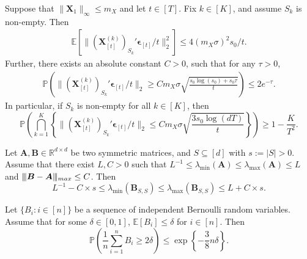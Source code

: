 \documentclass[10pt,a4paper]{amsart}
\newcommand{\Exp}{\mathbb{E}}
\newcommand{\Pro}{\mathbb{P}}
\newcommand{\bA}{\boldsymbol{A}}
\newcommand{\bX}{\boldsymbol{X}}
\newcommand{\bd}[1]{\boldsymbol{#1}}
\newcommand{\bepsilon}{\bd{\epsilon}}
\newcommand{\lmax}[1]{\lambda_{\max}\left(#1\right)}
\newcommand{\lmin}[1]{\lambda_{\min}\left(#1\right)}
\newcommand{\mR}{\mathbb{R}}
\newcommand{\mn}{\vert\kern-0.25ex \vert\kern-0.25ex \vert}
\begin{document}
\begin{lemma} \label{lemma: ell_2 bound of x epsilon}
Suppose that $\|\bX_1\|_{\infty}\le m_X$ and let $t \in [T]$. Fix $k \in [K]$, and assume $S_k$ is non-empty. Then 
\begin{align*}
     \Exp\left[ \|(\bX_{[t]}^{(k)})_{S_k}'\bepsilon_{[t]}/t \|_2^2 \right] \le  4(m_X\sigma)^2s_0/t.
\end{align*}
Further, there exists an absolute constant $C>0$, such that for any $\tau>0$,
\begin{align*}
\Pro\left(\|(\bX_{[t]}^{(k)})_{S_k}'\bepsilon_{[t]}/t\|_2 \ge C  m_X\sigma\sqrt{\frac{s_0\log (s_0) + s_0\tau}{t}} \right) \le 2e^{-\tau}.
\end{align*}
In particular, if $S_k$ is non-empty for all $k \in [K]$, then
$$\Pro\left(\bigcap_{k = 1}^{K}\left\{\|(\bX_{[t]}^{(k)})_{S_k}'\bepsilon_{[t]}/t\|_2 \le C  m_X\sigma\sqrt{\frac{3s_0\log (dT)}{t}} \right\} \right)\geq 1- \frac{K}{T^2}.$$
\end{lemma}

\begin{lemma} \label{lemma: subgaussian lower eigenvalue whp}
Let $\bA, \bd{B}\in \mR^{d\times d}$ be two symmetric matrices, and  $S \subseteq [d]$ with $s:=|S| > 0$.  Assume that there exist  $L,C>0$ such that 
$L^{-1}\le \lmin{\bA}\le\lmax{\bA}\le L$ and $\mn\bd{B}-\bA\mn_{\textup{max}}\le C$.
Then 
$$
L^{-1}-C\times s\le \lmin{\bd{B}_{S,S}} \le \lmax{\bd{B}_{S,S}}\le L+C \times s.
$$
\end{lemma}

\begin{lemma}\label{lemma: concentration inequality of bernoulli}
Let $\{B_i: i\in[n]\}$ be a sequence of independent Bernoulli random variables. Assume that for some $\delta \in [0,1]$, $\Exp[B_i] \leq \delta$ for $i \in [n]$. Then
$$
\Pro\left(\frac{1}{n}\sum_{i=1}^n B_i\ge 2\delta \right)\le \exp\left\{-\frac{3}{8}n\delta\right\}.
$$
\end{lemma}
\end{document}
